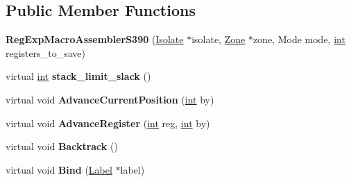 \subsection*{Public Member Functions}
\begin{DoxyCompactItemize}
\item 
\mbox{\label{classv8_1_1internal_1_1RegExpMacroAssemblerS390_af615e0b83e5b78405b32ee008cad2415}} 
{\bfseries Reg\+Exp\+Macro\+Assembler\+S390} (\mbox{\hyperlink{classv8_1_1internal_1_1Isolate}{Isolate}} $\ast$isolate, \mbox{\hyperlink{classv8_1_1internal_1_1Zone}{Zone}} $\ast$zone, Mode mode, \mbox{\hyperlink{classint}{int}} registers\+\_\+to\+\_\+save)
\item 
\mbox{\label{classv8_1_1internal_1_1RegExpMacroAssemblerS390_aeb35006f7cc46af3df70ada2416af928}} 
virtual \mbox{\hyperlink{classint}{int}} {\bfseries stack\+\_\+limit\+\_\+slack} ()
\item 
\mbox{\label{classv8_1_1internal_1_1RegExpMacroAssemblerS390_af6781152d4c094ec11c41077f1117cfb}} 
virtual void {\bfseries Advance\+Current\+Position} (\mbox{\hyperlink{classint}{int}} by)
\item 
\mbox{\label{classv8_1_1internal_1_1RegExpMacroAssemblerS390_a0f23b509690105372c0745d204ba632a}} 
virtual void {\bfseries Advance\+Register} (\mbox{\hyperlink{classint}{int}} reg, \mbox{\hyperlink{classint}{int}} by)
\item 
\mbox{\label{classv8_1_1internal_1_1RegExpMacroAssemblerS390_a3c8255e5c9f024b9462b9289d42172df}} 
virtual void {\bfseries Backtrack} ()
\item 
\mbox{\label{classv8_1_1internal_1_1RegExpMacroAssemblerS390_a2283afa39cdf68351985857eac0f0d5f}} 
virtual void {\bfseries Bind} (\mbox{\hyperlink{classv8_1_1internal_1_1Label}{Label}} $\ast$label)
\item 
\mbox{\label{classv8_1_1internal_1_1RegExpMacroAssemblerS390_aaa8a2096c560dce42ed31c9291a5e92b}} 

\end{DoxyCompactItemize}
